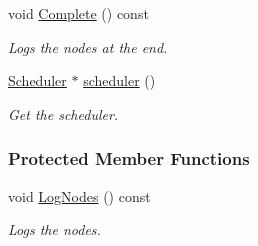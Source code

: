 \begin{DoxyCompactItemize}
\mbox{\label{classosse_1_1collaborate_1_1_observing_system_a11c8616261fcf49fe02cddcfb662712c}} 
void \hyperlink{classosse_1_1collaborate_1_1_observing_system_a11c8616261fcf49fe02cddcfb662712c}{Complete} () const
\begin{DoxyCompactList}\small\item\em Logs the nodes at the end. \end{DoxyCompactList}\item 
\hyperlink{classosse_1_1collaborate_1_1_scheduler}{Scheduler} $\ast$ \hyperlink{classosse_1_1collaborate_1_1_observing_system_aaf4978922f6cdc6f361905a0523ce8a5}{scheduler} ()
\begin{DoxyCompactList}\small\item\em Get the scheduler. \end{DoxyCompactList}\end{DoxyCompactItemize}
\subsubsection*{Protected Member Functions}
\begin{DoxyCompactItemize}
\item 
\mbox{\label{classosse_1_1collaborate_1_1_observing_system_afd35e353e3bfa35992269ec9310995d8}} 
void \hyperlink{classosse_1_1collaborate_1_1_observing_system_afd35e353e3bfa35992269ec9310995d8}{Log\+Nodes} () const
\begin{DoxyCompactList}\small\item\em Logs the nodes. \end{DoxyCompactList}\end{DoxyCompactItemize}
